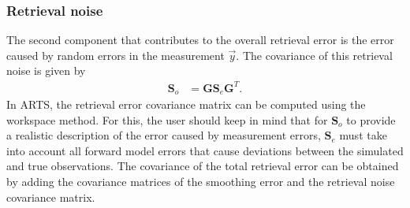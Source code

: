 \subsubsection{Retrieval noise}

The second component that contributes to the overall retrieval error is
the error caused by random errors in the measurement $\vec{y}$.
  The covariance of this retrieval noise is given by
%
\begin{eqnarray}
\mathbf{S}_o &= \mathbf{G}\mathbf{S}_e\mathbf{G}^T.
\end{eqnarray}
%
In ARTS, the retrieval error covariance matrix can be computed using the
  workspace method. For this, the user should keep
in mind that for $\mathbf{S}_o$ to provide a realistic description of the
error caused by measurement errors, $\mathbf{S}_e$ must take into account all
forward model errors that cause deviations between the simulated and true
observations.  The covariance of the total retrieval error can be obtained
 by adding the covariance matrices of the smoothing error and the retrieval
 noise covariance matrix.
